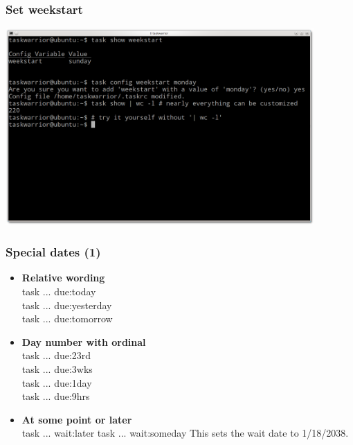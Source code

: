 \documentclass[t,handout]{beamer}
\begin{document}
\begin{frame}[fragile]\frametitle{Set weekstart}
\begin{center} %
\includegraphics[width=11.8cm,height=7.5cm]{weekstart.png}
\end{center}
\end{frame}

\begin{frame}\frametitle{Special dates (1)}
\begin{itemize}
\item \textbf{Relative wording} \\
task ... due:today \\
task ... due:yesterday \\
task ... due:tomorrow \\
\item \textbf{Day number with ordinal} \\
task ... due:23rd \\
task ... due:3wks \\
task ... due:1day \\
task ... due:9hrs \\
\item \textbf{At some point or later} \\
task ... wait:later
task ... wait:someday
This sets the wait date to 1/18/2038.
\end{itemize}
\end{frame}
\end{document}
